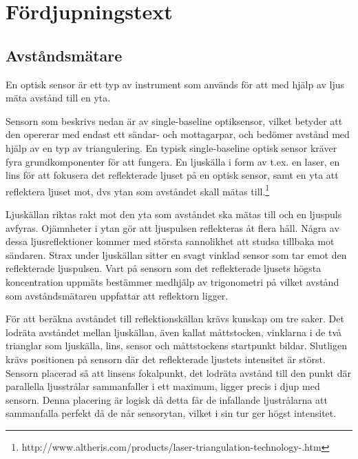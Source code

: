 \documentclass[a4paper,12pt,fleqn]{article}
\begin{document}
\section{Fördjupningstext}
\subsection{Avståndsmätare}
En optisk sensor är ett typ av instrument som används för att med hjälp av ljus mäta avstånd till en yta.

Sensorn som beskrivs nedan är av single-baseline optiksensor, vilket betyder att den opererar med endast ett sändar- och mottagarpar, och bedömer avstånd med hjälp av en typ av triangulering.
En typisk single-baseline optisk sensor kräver fyra grundkomponenter för att fungera.
En ljuskälla i form av t.ex. en laser, en lins för att fokusera det reflekterade ljuset på 
en optisk sensor, samt en yta att reflektera ljuset mot, dvs ytan som avståndet skall mätas till.\footnote{http://www.altheris.com/products/laser-triangulation-technology-.htm}

Ljuskällan riktas rakt mot den yta som avståndet ska mätas till och en ljuspuls avfyras. Ojämnheter i ytan gör att ljuspulsen reflekteras åt flera håll. Några av dessa ljusreflektioner kommer med största sannolikhet att studsa tillbaka mot sändaren.
Strax under ljuskällan sitter en svagt vinklad sensor som tar emot den reflekterade ljuspulsen.  Vart på sensorn som det reflekterade ljusets högsta koncentration uppmäts bestämmer medhjälp av trigonometri på vilket avstånd som avståndsmätaren uppfattar att reflektorn ligger.


För att beräkna avståndet till reflektionskällan krävs kunskap om tre saker.
Det lodräta avståndet mellan ljuskällan, även kallat måttstocken, vinklarna i de två trianglar som ljuskälla, lins, sensor och måttstockens startpunkt bildar. Slutligen krävs positionen på sensorn där det reflekterade ljustets intensitet är störst. Sensorn placerad så att linsens fokalpunkt, det lodräta avstånd till den punkt där parallella ljusstrålar sammanfaller i ett maximum, ligger precis i djup med sensorn. Denna placering är logisk då detta får de infallande ljustrålarna att sammanfalla perfekt då de når sensorytan, vilket i sin tur ger högst intensitet.
\end{document}
